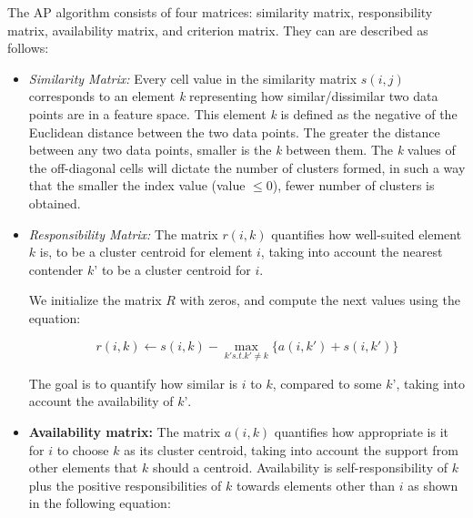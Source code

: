 \documentclass[../UNBThesis2.tex]{subfiles}
\begin{document}
The AP algorithm consists of four matrices: similarity matrix, responsibility matrix, availability matrix, and criterion matrix. They can are described as follows:

\begin{itemize}

  \item\textit{Similarity Matrix:}
  Every cell value in the similarity matrix $s(i,j)$ corresponds to an element \textit{k} representing how similar/dissimilar two data points are in a feature space. This element \textit{k} is defined as the negative of the Euclidean distance between the two data points. The greater the distance between any two data points, smaller is the \textit{k} between them. The \textit{k} values of the off-diagonal cells will dictate the number of clusters formed, in such a way that the smaller the index value (value	$\leq$0), fewer number of clusters is obtained.
  \item\textit{Responsibility Matrix:} The matrix $r(i , k)$ quantifies how well-suited element $k$ is, to be a cluster centroid for element $i$, taking into account the nearest contender $k’$ to be a cluster centroid for $i$.
  
  We initialize the matrix $R$ with zeros, and compute the next values using the equation:

    \begin{equation}
        r(i, k) \leftarrow s(i, k) - \max\limits_{k' s.t. k' \neq k}\{ a(i, k') + s(i, k') \}
    \end{equation}
 
 The goal is to quantify how similar is $i$ to $k$, compared to some $k$’, taking into account the availability of $k’$.   
    
  \item\textbf{Availability matrix:} The matrix $a(i,k)$ quantifies how appropriate is it for $i$ to choose $k$ as its cluster centroid, taking into account the support from other elements that $k$ should a centroid. Availability is self-responsibility of $k$ plus the positive responsibilities of $k$ towards elements other than $i$ as shown in the following equation:
  

\end{itemize}
\end{document}
